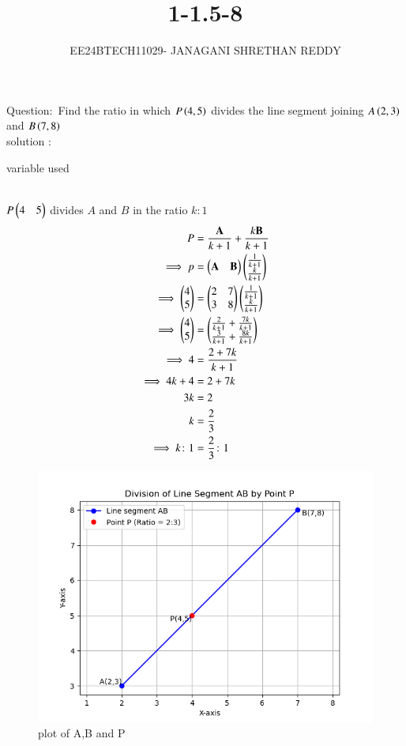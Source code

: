 \documentclass[journal]{IEEEtran}
\begin{document}
 


\vspace{3cm}

\title{1-1.5-8}
\author{EE24BTECH11029- JANAGANI SHRETHAN REDDY}
\maketitle
\bigskip
\renewcommand{\thefigure}{\theenumi}
\renewcommand{\thetable}{\theenumi}

Question$\colon$
     Find the ratio in which $P\left(4,5\right)$ divides the line segment joining $A\left(2,3\right)$ and $B\left(7,8\right)$\\

solution $\colon$
\begin{table}[h!]
 \centering
 
 \caption{variable used}
\end{table}\\
 $P\begin{pmatrix}4&5\end{pmatrix}$ divides $A$ and $B$ in the ratio $k\colon1$
\begin{align}
 P&=\frac{\vec{A}}{k+1}+\frac{k\vec{B}}{k+1}\\
\implies p&=\myvec{\Vec{A}&\Vec{B}}\myvec{\frac{1}{k+1}\\\frac{k}{k+1}}\\
\implies \myvec{4\\5}&=\myvec{2&7\\3&8}\myvec{\frac{1}{k+1}\\\frac{k}{k+1}}\\
\implies \myvec{4\\5}&=\myvec{\frac{2}{k+1}+\frac{7k}{k+1}\\\frac{3}{k+1}+\frac{8k}{k+1}}\\
\implies 4&=\frac{2+7k}{k+1}\\
\implies 4k+4&=2+7k\\
3k&=2\\
k&=\frac{2}{3}\\
\implies k\colon1&=\frac{2}{3}\colon1
 \end{align}
 \begin{figure}[h!]
  \centering
  \includegraphics[width=1\linewidth]{fig.png}
  \caption{plot of A,B and P}
 \end{figure}
 
\end{document}
